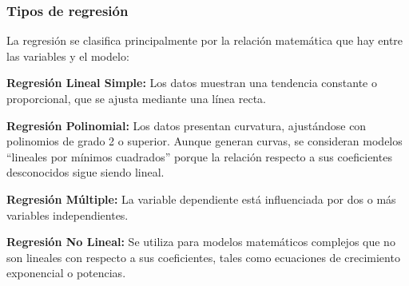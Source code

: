\subsubsection{Tipos de regresión}
La regresión se clasifica principalmente por la relación matemática que hay entre las variables y el modelo:\par
\textbf{Regresión Lineal Simple:} Los datos muestran una tendencia constante o proporcional, que se ajusta mediante una línea recta.\par
\textbf{Regresión Polinomial:} Los datos presentan curvatura, ajustándose con polinomios de grado 2 o superior. Aunque generan curvas, se consideran modelos \enquote{lineales por mínimos cuadrados} porque la relación respecto a sus coeficientes desconocidos sigue siendo lineal.\par
\textbf{Regresión Múltiple:} La variable dependiente está influenciada por dos o más variables independientes.\par
\textbf{Regresión No Lineal:} Se utiliza para modelos matemáticos complejos que no son lineales con respecto a sus coeficientes, tales como ecuaciones de crecimiento exponencial o potencias.

